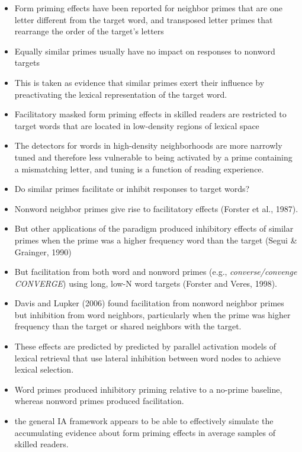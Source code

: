 \documentclass[]{article}
\begin{document}
\begin{itemize}
			\item  Form priming effects have been reported for neighbor primes that are one letter different from the target word, and transposed letter primes that rearrange the order of the target’s letters
			\item Equally similar primes usually have no impact on responses to nonword targets
			\item This is taken as evidence that similar primes exert their influence by preactivating the lexical representation of the target word. 
			\item Facilitatory masked form priming effects in skilled readers  are restricted to target words that are located in low-density regions of lexical space
			\item The detectors for words in high-density neighborhoods are more narrowly tuned and therefore less vulnerable to being activated by a prime containing a mismatching letter, and tuning is a function of reading experience.
			\item Do similar primes facilitate or inhibit responses to target words?
			\item Nonword neighbor primes give rise to facilitatory effects (Forster et al., 1987).
			\item But other applications of the paradigm produced inhibitory effects of similar primes when the prime was a higher frequency word than the target (Segui \& Grainger, 1990)
			\item But facilitation from both word and nonword primes (e.g., \textit{converse/convenge CONVERGE}) using long, low-N word targets (Forster and Veres, 1998).
			\item Davis and Lupker (2006) found facilitation from nonword neighbor primes but inhibition from word neighbors, particularly when the prime was higher frequency than the target or shared neighbors with the target.
			\item These effects are predicted by  predicted by parallel activation 	models of lexical retrieval that use lateral inhibition between word nodes to achieve lexical selection. 
			\item Word primes produced inhibitory priming relative to a no-prime baseline, whereas nonword primes produced facilitation.
			\item the general IA framework appears to be able to effectively simulate the accumulating evidence about form priming effects in average samples of skilled readers.
	\end{itemize}
	
\end{document}
